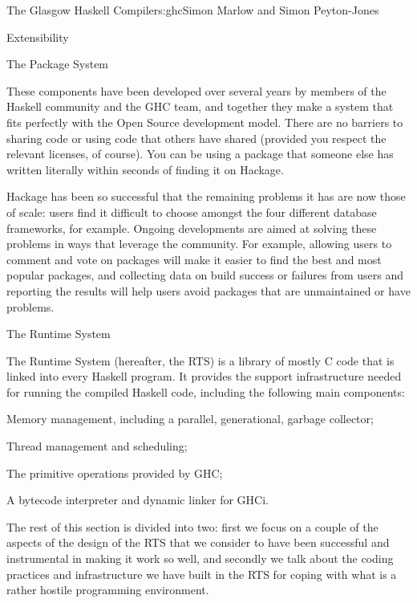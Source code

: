 \begin{aosachapter}{The Glasgow Haskell Compiler}{s:ghc}{Simon Marlow and Simon Peyton-Jones}
\begin{aosasect1}{Extensibility}
\begin{aosasect2}{The Package System}
\begin{aosaitemize}
\end{aosaitemize}

These components have been developed over several years by members of
the Haskell community and the GHC team, and together they make a
system that fits perfectly with the Open Source development model.
There are no barriers to sharing code or using code that others have
shared (provided you respect the relevant licenses, of course).  You
can be using a package that someone else has written literally within
seconds of finding it on Hackage.

Hackage has been so successful that the remaining problems it has are
now those of scale: users find it difficult to choose amongst the four
different database frameworks, for example.  Ongoing developments are
aimed at solving these problems in ways that leverage the community.
For example, allowing users to comment and vote on packages will make
it easier to find the best and most popular packages, and collecting
data on build success or failures from users and reporting the results
will help users avoid packages that are unmaintained or have problems.

\end{aosasect2}

\end{aosasect1}

\begin{aosasect1}{The Runtime System}
\label{sec.ghc.rts}

The Runtime System (hereafter, the RTS) is a library of mostly C code
that is linked into every Haskell program.  It provides the support
infrastructure needed for running the compiled Haskell code, including
the following main components:

\begin{aosaitemize}

\item Memory management, including a parallel, generational, garbage
  collector;

\item Thread management and scheduling;

\item The primitive operations provided by GHC;

\item A bytecode interpreter and dynamic linker for GHCi.

\end{aosaitemize}

The rest of this section is divided into two: first we focus on a
couple of the aspects of the design of the RTS that we consider to
have been successful and instrumental in making it work so well, and
secondly we talk about the coding practices and infrastructure we have
built in the RTS for coping with what is a rather hostile programming
environment.


\end{aosasect1}
\end{aosachapter}
